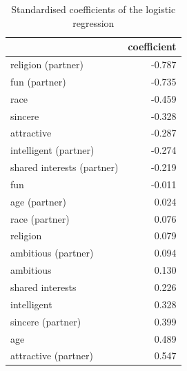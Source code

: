 \begin{table}[htbp]
\centering
\caption{Standardised coefficients of the logistic regression}
\label{tab:q8_coefficients}
\begin{tabular}{lr}
\toprule
 & coefficient \\
\midrule
religion (partner) & -0.787 \\
fun (partner) & -0.735 \\
race & -0.459 \\
sincere & -0.328 \\
attractive & -0.287 \\
intelligent (partner) & -0.274 \\
shared interests (partner) & -0.219 \\
fun & -0.011 \\
age (partner) & 0.024 \\
race (partner) & 0.076 \\
religion & 0.079 \\
ambitious (partner) & 0.094 \\
ambitious & 0.130 \\
shared interests & 0.226 \\
intelligent & 0.328 \\
sincere (partner) & 0.399 \\
age & 0.489 \\
attractive (partner) & 0.547 \\
\bottomrule
\end{tabular}
\end{table}
